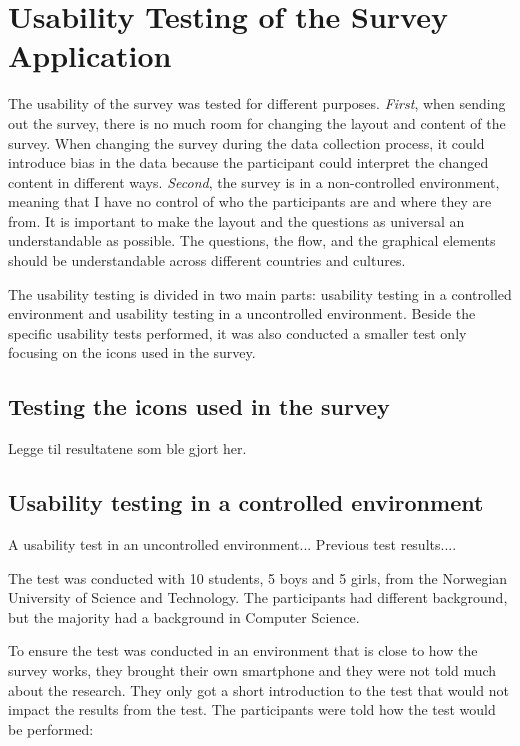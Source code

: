 \section{Usability Testing of the Survey Application}

  The usability of the survey was tested for different purposes. {\it First}, when sending out the survey, there is no much room for changing the layout and content of the survey. When changing the survey during the data collection process, it could introduce bias in the data because the participant could interpret the changed content in different ways. {\it Second}, the survey is in a non-controlled environment, meaning that I have no control of who the participants are and where they are from. It is important to make the layout and the questions as universal an understandable as possible. The questions, the flow, and the graphical elements should be understandable across different countries and cultures. 

  The usability testing is divided in two main parts: usability testing in a controlled environment and usability testing in a uncontrolled environment. Beside the specific usability tests performed, it was also conducted a smaller test only focusing on the icons used in the survey.

    \subsection{Testing the icons used in the survey}
      Legge til resultatene som ble gjort her.

  	\subsection{Usability testing in a controlled environment}
    A usability test in an uncontrolled environment...
    Previous test results....

    The test was conducted with 10 students, 5 boys and 5 girls, from the Norwegian University of Science and Technology. The participants had different background, but the majority had a background in Computer Science.

    To ensure the test was conducted in an environment that is close to how the survey works, they brought their own smartphone and they were not told much about the research. They only got a short introduction to the test that would not impact the results from the test. The participants were told how the test would be performed:

